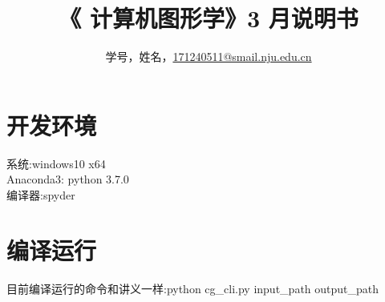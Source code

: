 \documentclass[a4paper,UTF8]{article}
\theoremstyle{definition}
\begin{document}
\title{\textbf{《 计算机图形学》3 月说明书}}
\author{学号，姓名，\href{mailto:xxx@xxx.com}{171240511@smail.nju.edu.cn}}
\maketitle

\section{开发环境}
系统:windows10 x64\\
\indent Anaconda3: python 3.7.0\\
\indent 编译器:spyder

\section{编译运行}
目前编译运行的命令和讲义一样:python cg\_cli.py input\_path output\_path\\
\end{document}
